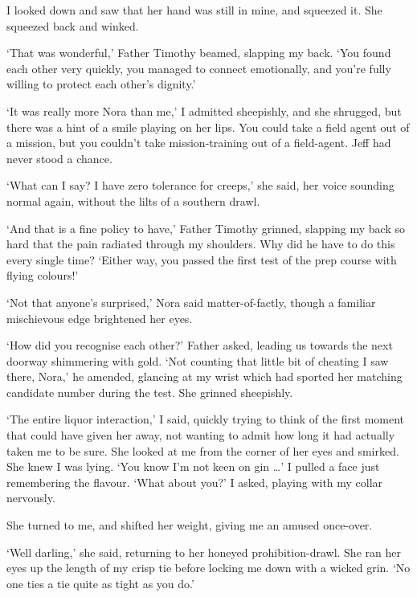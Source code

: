 I looked down and saw that her hand was still in mine, and squeezed
it. She squeezed back and winked.

`That was wonderful,' Father Timothy beamed, slapping my back. `You
found each other very quickly, you managed to connect emotionally, and
you're fully willing to protect each other's dignity.'

`It was really more Nora than me,' I admitted sheepishly, and she
shrugged, but there was a hint of a smile playing on her lips. You
could take a field agent out of a mission, but you couldn't take
mission-training out of a field-agent. Jeff had never stood a chance.

`What can I say? I have zero tolerance for creeps,' she said, her
voice sounding normal again, without the lilts of a southern drawl.

`And that is a fine policy to have,' Father Timothy grinned, slapping
my back so hard that the pain radiated through my shoulders. Why did
he have to do this every single time? `Either way, you passed the
first test of the prep course with flying colours!'

`Not that anyone's surprised,' Nora said matter-of-factly, though a
familiar mischievous edge brightened her eyes.

`How did you recognise each other?' Father asked, leading us towards
the next doorway shimmering with gold. `Not counting that little bit
of cheating I saw there, Nora,' he amended, glancing at my wrist which
had sported her matching candidate number during the test. She grinned
sheepishly.

`The entire liquor interaction,' I said, quickly trying to think of
the first moment that could have given her away, not wanting to admit
how long it had actually taken me to be sure. She looked at me from
the corner of her eyes and smirked. She knew I was lying. `You know
I'm not keen on gin \ldots ' I pulled a face just remembering the
flavour. `What about you?' I asked, playing with my collar nervously.

She turned to me, and shifted her weight, giving me an amused
once-over.

`Well darling,' she said, returning to her honeyed
prohibition-drawl. She ran her eyes up the length of my crisp tie
before locking me down with a wicked grin. `No one ties a tie quite as
tight as you do.'

